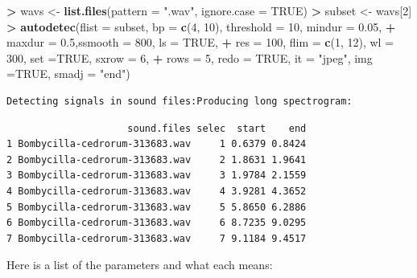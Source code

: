 \documentclass[
]{krantz}
\makeatletter
\newenvironment{Shaded}{\begin{snugshade}}{\end{snugshade}}
\newcommand{\DataTypeTok}[1]{\textcolor[rgb]{0.27,0.27,0.27}{#1}}
\newcommand{\DecValTok}[1]{\textcolor[rgb]{0.06,0.06,0.06}{#1}}
\newcommand{\FloatTok}[1]{\textcolor[rgb]{0.06,0.06,0.06}{#1}}
\newcommand{\KeywordTok}[1]{\textcolor[rgb]{0.27,0.27,0.27}{\textbf{#1}}}
\newcommand{\NormalTok}[1]{#1}
\newcommand{\OperatorTok}[1]{\textcolor[rgb]{0.43,0.43,0.43}{\textbf{#1}}}
\newcommand{\OtherTok}[1]{\textcolor[rgb]{0.37,0.37,0.37}{#1}}
\newcommand{\StringTok}[1]{\textcolor[rgb]{0.5,0.5,0.5}{#1}}
\newenvironment{kframe}{%
\medskip{}
\setlength{\fboxsep}{.8em}
 \def\at@end@of@kframe{}%
 \ifinner\ifhmode%
  \def\at@end@of@kframe{\end{minipage}}%
  \begin{minipage}{\columnwidth}%
 \fi\fi%
 \def\FrameCommand##1{\hskip\@totalleftmargin \hskip-\fboxsep
 \colorbox{shadecolor}{##1}\hskip-\fboxsep
     \hskip-\linewidth \hskip-\@totalleftmargin \hskip\columnwidth}%
 \MakeFramed {\advance\hsize-\width
   \@totalleftmargin\z@ \linewidth\hsize
   \@setminipage}}%
 {\par\unskip\endMakeFramed%
 \at@end@of@kframe}
\renewenvironment{Shaded}{\begin{kframe}}{\end{kframe}}
\makeatother
\begin{document}
\begin{Shaded}
\begin{Highlighting}[]
\OperatorTok{\textgreater{}}\StringTok{ }\NormalTok{wavs \textless{}{-}}\StringTok{ }\KeywordTok{list.files}\NormalTok{(}\DataTypeTok{pattern =} \StringTok{".wav"}\NormalTok{, }\DataTypeTok{ignore.case =} \OtherTok{TRUE}\NormalTok{)}
\OperatorTok{\textgreater{}}\StringTok{ }\NormalTok{subset \textless{}{-}}\StringTok{ }\NormalTok{wavs[}\DecValTok{2}\NormalTok{]}
\OperatorTok{\textgreater{}}\StringTok{ }\KeywordTok{autodetec}\NormalTok{(}\DataTypeTok{flist =}\NormalTok{ subset, }\DataTypeTok{bp =} \KeywordTok{c}\NormalTok{(}\DecValTok{4}\NormalTok{, }\DecValTok{10}\NormalTok{), }\DataTypeTok{threshold =} \DecValTok{10}\NormalTok{, }\DataTypeTok{mindur =} \FloatTok{0.05}\NormalTok{,}
\OperatorTok{+}\StringTok{            }\DataTypeTok{maxdur =} \FloatTok{0.5}\NormalTok{,}\DataTypeTok{ssmooth =} \DecValTok{800}\NormalTok{, }\DataTypeTok{ls =} \OtherTok{TRUE}\NormalTok{,}
\OperatorTok{+}\StringTok{            }\DataTypeTok{res =} \DecValTok{100}\NormalTok{, }\DataTypeTok{flim =} \KeywordTok{c}\NormalTok{(}\DecValTok{1}\NormalTok{, }\DecValTok{12}\NormalTok{), }\DataTypeTok{wl =} \DecValTok{300}\NormalTok{, }\DataTypeTok{set =}\OtherTok{TRUE}\NormalTok{, }\DataTypeTok{sxrow =} \DecValTok{6}\NormalTok{,}
\OperatorTok{+}\StringTok{            }\DataTypeTok{rows =} \DecValTok{5}\NormalTok{, }\DataTypeTok{redo =} \OtherTok{TRUE}\NormalTok{, }\DataTypeTok{it =} \StringTok{"jpeg"}\NormalTok{, }\DataTypeTok{img =}\OtherTok{TRUE}\NormalTok{, }\DataTypeTok{smadj =} \StringTok{"end"}\NormalTok{)}
\end{Highlighting}
\end{Shaded}

\begin{verbatim}
Detecting signals in sound files:Producing long spectrogram:
\end{verbatim}

\begin{verbatim}
                     sound.files selec  start    end
1 Bombycilla-cedrorum-313683.wav     1 0.6379 0.8424
2 Bombycilla-cedrorum-313683.wav     2 1.8631 1.9641
3 Bombycilla-cedrorum-313683.wav     3 1.9784 2.1559
4 Bombycilla-cedrorum-313683.wav     4 3.9281 4.3652
5 Bombycilla-cedrorum-313683.wav     5 5.8650 6.2886
6 Bombycilla-cedrorum-313683.wav     6 8.7235 9.0295
7 Bombycilla-cedrorum-313683.wav     7 9.1184 9.4517
\end{verbatim}

Here is a list of the parameters and what each means:
\end{document}
